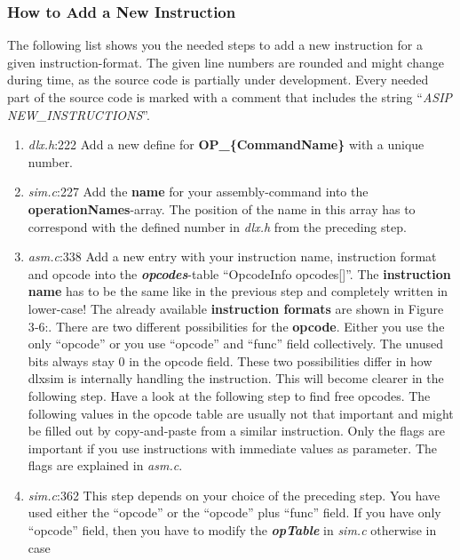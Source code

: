 \documentclass[
]{article}
\begin{document}
\hypertarget{how-to-add-a-new-instruction}{%
\subsubsection{How to Add a New
Instruction}\label{how-to-add-a-new-instruction}}

The following list shows you the needed steps to add a new instruction
for a given instruction-format. The given line numbers are rounded and
might change during time, as the source code is partially under
development. Every needed part of the source code is marked with a
comment that includes the string ``\emph{ASIP NEW\_INSTRUCTIONS}''.

\begin{enumerate}
\def\labelenumi{\arabic{enumi}.}
\item
  \emph{dlx.h}:222 Add a new define for \textbf{OP\_\{CommandName\}}
  with a unique number.
\item
  \emph{sim.c}:227 Add the \textbf{name} for your assembly-command into
  the \textbf{operationNames}-array. The position of the name in this
  array has to correspond with the defined number in \emph{dlx.h} from
  the preceding step.
\item
  \emph{asm.c}:338 Add a new entry with your instruction name,
  instruction format and opcode into the \emph{\textbf{opcodes}}-table
  ``OpcodeInfo opcodes{[}{]}''. The \textbf{instruction name} has to be
  the same like in the previous step and completely written in
  lower-case! The already available \textbf{instruction formats} are
  shown in Figure 3‑6:. There are two different possibilities for the
  \textbf{opcode}. Either you use the only ``opcode'' or you use
  ``opcode'' and ``func'' field collectively. The unused bits always
  stay 0 in the opcode field. These two possibilities differ in how
  dlxsim is internally handling the instruction. This will become
  clearer in the following step. Have a look at the following step to
  find free opcodes. The following values in the opcode table are
  usually not that important and might be filled out by copy-and-paste
  from a similar instruction. Only the flags are important if you use
  instructions with immediate values as parameter. The flags are
  explained in \emph{asm.c}.
\item
  \emph{sim.c}:362 This step depends on your choice of the preceding
  step. You have used either the ``opcode'' or the ``opcode'' plus
  ``func'' field. If you have only ``opcode'' field, then you have to
  modify the \emph{\textbf{opTable}} in \emph{sim.c} otherwise in case

\end{enumerate}
\end{document}
